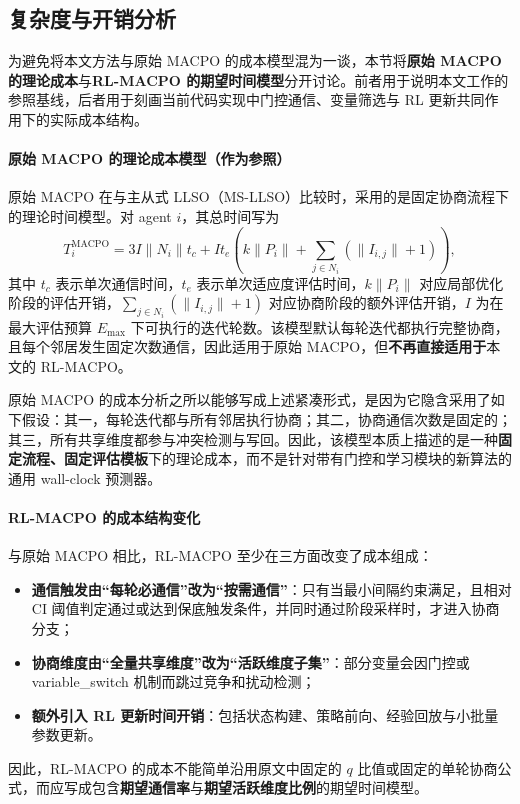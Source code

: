 \documentclass[12pt]{ctexart}
\begin{document}
\subsection{复杂度与开销分析}

为避免将本文方法与原始 MACPO 的成本模型混为一谈，本节将\textbf{原始 MACPO 的理论成本}与\textbf{RL-MACPO 的期望时间模型}分开讨论。前者用于说明本文工作的参照基线，后者用于刻画当前代码实现中门控通信、变量筛选与 RL 更新共同作用下的实际成本结构。

\paragraph{原始 MACPO 的理论成本模型（作为参照）}
原始 MACPO 在与主从式 LLSO（MS-LLSO）比较时，采用的是固定协商流程下的理论时间模型。对 agent $i$，其总时间写为
\[
T_i^{\mathrm{MACPO}}
=
3I\lVert N_i\rVert t_c
+ 
I t_e\left(k\lVert P_i\rVert+\sum_{j\in N_i}(\lVert I_{i,j}\rVert+1)\right),
\]
其中 $t_c$ 表示单次通信时间，$t_e$ 表示单次适应度评估时间，$k\lVert P_i\rVert$ 对应局部优化阶段的评估开销，$\sum_{j\in N_i}(\lVert I_{i,j}\rVert+1)$ 对应协商阶段的额外评估开销，$I$ 为在最大评估预算 $E_{\max}$ 下可执行的迭代轮数。该模型默认每轮迭代都执行完整协商，且每个邻居发生固定次数通信，因此适用于原始 MACPO，但\textbf{不再直接适用于}本文的 RL-MACPO。

原始 MACPO 的成本分析之所以能够写成上述紧凑形式，是因为它隐含采用了如下假设：其一，每轮迭代都与所有邻居执行协商；其二，协商通信次数是固定的；其三，所有共享维度都参与冲突检测与写回。因此，该模型本质上描述的是一种\textbf{固定流程、固定评估模板}下的理论成本，而不是针对带有门控和学习模块的新算法的通用 wall-clock 预测器。

\paragraph{RL-MACPO 的成本结构变化}
与原始 MACPO 相比，RL-MACPO 至少在三方面改变了成本组成：
\begin{itemize}
\item \textbf{通信触发由“每轮必通信”改为“按需通信”}：只有当最小间隔约束满足，且相对 CI 阈值判定通过或达到保底触发条件，并同时通过阶段采样时，才进入协商分支；
\item \textbf{协商维度由“全量共享维度”改为“活跃维度子集”}：部分变量会因门控或 variable\_switch 机制而跳过竞争和扰动检测；
\item \textbf{额外引入 RL 更新时间开销}：包括状态构建、策略前向、经验回放与小批量参数更新。
\end{itemize}
因此，RL-MACPO 的成本不能简单沿用原文中固定的 $q$ 比值或固定的单轮协商公式，而应写成包含\textbf{期望通信率}与\textbf{期望活跃维度比例}的期望时间模型。
\end{document}
